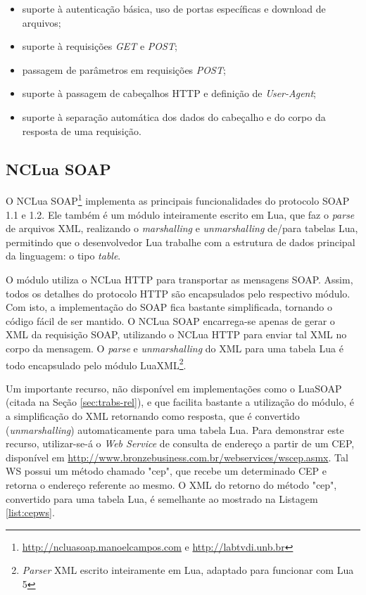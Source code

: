 \begin{itemize}
  \item suporte à autenticação básica, uso de portas específicas e download de arquivos;
  \item suporte à requisições \textit{GET} e \textit{POST};
  \item passagem de parâmetros em requisições \textit{POST};
  \item suporte à passagem de cabeçalhos HTTP e definição de \textit{User-Agent};
  \item suporte à separação automática dos dados do cabeçalho e do corpo da resposta de uma requisição.
\end{itemize}

\subsection{NCLua SOAP} \label{sec:ncluasoap}
O NCLua SOAP\footnote{\url{http://ncluasoap.manoelcampos.com} e \url{http://labtvdi.unb.br}} implementa as principais funcionalidades do protocolo SOAP 1.1 e 1.2. 
Ele também é um módulo inteiramente
escrito em Lua, que faz o \textit{parse} de arquivos XML, 
realizando o \textit{marshalling} e \textit{unmarshalling} de/para tabelas Lua, permitindo que o desenvolvedor Lua
trabalhe com a estrutura de dados principal da linguagem: o tipo \textit{table}.

O módulo utiliza o NCLua HTTP para transportar as mensagens SOAP. Assim, todos os detalhes do protocolo HTTP são 
encapsulados pelo respectivo módulo. Com isto, a implementação do SOAP fica bastante simplificada, tornando o código
fácil de ser mantido. O NCLua SOAP encarrega-se apenas de gerar o XML da requisição SOAP, utilizando
o NCLua HTTP para enviar tal XML no corpo da mensagem. O \textit{parse} e \textit{unmarshalling} do XML para uma tabela Lua
é todo encapsulado pelo módulo LuaXML\footnote{\textit{Parser} XML escrito inteiramente em Lua, adaptado para funcionar com Lua 5}. 

Um importante recurso, não disponível em implementações como o LuaSOAP (citada na Seção \ref{sec:trabs-rel}),
e que facilita bastante a utilização do módulo, é a simplificação 
do XML retornando como resposta, que é convertido (\textit{unmarshalling}) automaticamente para uma tabela Lua.
Para demonstrar este recurso, utilizar-se-á o \textit{Web Service} de consulta de endereço a partir de um CEP,
disponível em \url{http://www.bronzebusiness.com.br/webservices/wscep.asmx}. Tal WS possui um método chamado "cep",
que recebe um determinado CEP e retorna o endereço referente ao mesmo.
O XML do retorno do método "cep", convertido para uma tabela Lua, é semelhante ao mostrado na Listagem \ref{list:cepws}.

